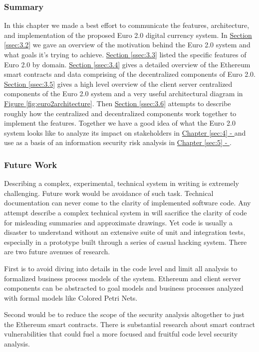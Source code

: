 \documentclass[a4paper,12pt]{article} %
\newcommand{\hyperfigureref}[1]{\hyperref[#1]{Figure \ref{#1}}}
\newcommand{\hypersectionref}[1]{\hyperref[#1]{Section \ref{#1}}}
\newcommand{\hyperchapterref}[1]{\hyperref[#1]{Chapter \ref{#1} - \nameref{#1}}}
\begin{document}
{\subsubsection{Summary} \label{ssec:3.7:summary}
In this chapter we made a best effort to communicate the features, architecture, and implementation of the proposed Euro 2.0 digital currency system.  In \hypersectionref{ssec:3.2} we gave an overview of the motivation behind the Euro 2.0 system and what goals it's trying to achieve. \hypersectionref{ssec:3.3} listed the specific features of Euro 2.0 by domain. \hypersectionref{ssec:3.4} gives a detailed overview of the Ethereum smart contracts and data comprising of the decentralized components of Euro 2.0. \hypersectionref{ssec:3.5} gives a high level overview of the client server centralized components of the Euro 2.0 system and a very useful architectural diagram in \hyperfigureref{fig:euro2architecture}. Then \hypersectionref{ssec:3.6} attempts to describe roughly how the centralized and decentralized components work together to implement the features. Together we have a good idea of what the Euro 2.0 system looks like to analyze its impact on stakeholders in \hyperchapterref{sec:4} and use as a basis of an information security risk analysis in \hyperchapterref{sec:5}.

\subsubsection{Future Work} \label{ssec:3.7:futureWork}

Describing a complex, experimental, technical system in writing is extremely challenging. Future work would be avoidance of such task. Technical documentation can never come to the clarity of implemented software code. Any attempt describe a complex technical system in will sacrifice the clarity of code for misleading summaries and approximate drawings. Yet code is usually a disaster to understand without an extensive suite of unit and integration tests, especially in a prototype built through a series of casual hacking system. There are two future avenues of research.

First is to avoid diving into details in the code level and limit all analysis to formalized business process models of the system. Ethereum and client server components can be abstracted to goal models and business processes analyzed with formal models like Colored Petri Nets\cite{6903169}\cite{Jensen:2007:CPN:1266780.1266789}.

Second would be to reduce the scope of the security analysis altogether to just the Ethereum smart contracts. There is substantial research about smart contract vulnerabilities that could fuel a more focused and fruitful code level security analysis\cite{cryptoeprint:2016:1007}\cite{Atzei2017}\cite{cryptoeprint:2015:460}.

}
\end{document}
